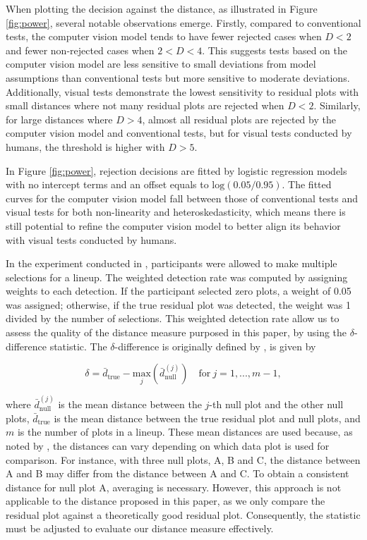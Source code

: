 \documentclass[]{interact}
\theoremstyle{plain}%
\theoremstyle{definition}
\theoremstyle{remark}
\begin{document}
When plotting the decision against the distance, as illustrated in
Figure \ref{fig:power}, several notable observations emerge. Firstly,
compared to conventional tests, the computer vision model tends to have
fewer rejected cases when \(D < 2\) and fewer non-rejected cases when
\(2< D < 4\). This suggests tests based on the computer vision model are
less sensitive to small deviations from model assumptions than
conventional tests but more sensitive to moderate deviations.
Additionally, visual tests demonstrate the lowest sensitivity to
residual plots with small distances where not many residual plots are
rejected when \(D < 2\). Similarly, for large distances where \(D > 4\),
almost all residual plots are rejected by the computer vision model and
conventional tests, but for visual tests conducted by humans, the
threshold is higher with \(D > 5\).

In Figure \ref{fig:power}, rejection decisions are fitted by logistic
regression models with no intercept terms and an offset equals to
\(\text{log}(0.05/0.95)\). The fitted curves for the computer vision
model fall between those of conventional tests and visual tests for both
non-linearity and heteroskedasticity, which means there is still
potential to refine the computer vision model to better align its
behavior with visual tests conducted by humans.

In the experiment conducted in \citet{li2024plot}, participants were
allowed to make multiple selections for a lineup. The weighted detection
rate was computed by assigning weights to each detection. If the
participant selected zero plots, a weight of 0.05 was assigned;
otherwise, if the true residual plot was detected, the weight was 1
divided by the number of selections. This weighted detection rate allow
us to assess the quality of the distance measure purposed in this paper,
by using the \(\delta\)-difference statistic. The \(\delta\)-difference
is originally defined by \citet{chowdhury2018measuring}, is given by

\[
\delta = \bar{d}_{\text{true}} - \underset{j}{\text{max}}\left(\bar{d}_{\text{null}}^{(j)}\right) \quad \text{for}~j = 1,...,m-1,
\]

where \(\bar{d}_{\text{null}}^{(j)}\) is the mean distance between the
\(j\)-th null plot and the other null plots, \(\bar{d}_{\text{true}}\)
is the mean distance between the true residual plot and null plots, and
\(m\) is the number of plots in a lineup. These mean distances are used
because, as noted by \citet{chowdhury2018measuring}, the distances can
vary depending on which data plot is used for comparison. For instance,
with three null plots, A, B and C, the distance between A and B may
differ from the distance between A and C. To obtain a consistent
distance for null plot A, averaging is necessary. However, this approach
is not applicable to the distance proposed in this paper, as we only
compare the residual plot against a theoretically good residual plot.
Consequently, the statistic must be adjusted to evaluate our distance
measure effectively.
\end{document}
